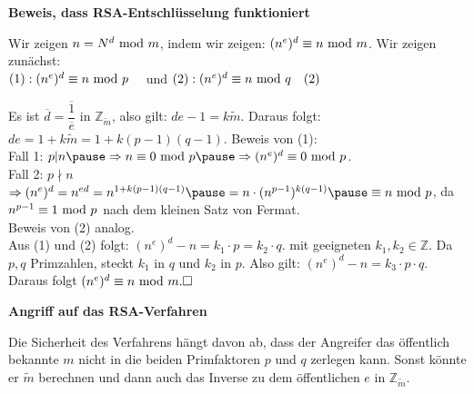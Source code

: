 \begin{frame}[fragile]

\textbf{Beweis, dass RSA-Entschlüsselung funktioniert} \pause

Wir zeigen $n = N^d \text{ mod } m$, indem wir zeigen: $(n^e)^d \equiv n \text{ mod } m$. \pause Wir zeigen
zunächst: \\
$(1): (n^e)^d \equiv n \text{ mod } p \quad  $ und $(2): (n^e)^d \equiv n \text{ mod } q \quad (2)$  \pause

Es ist $\overline{d} = \dfrac{\overline{1}}{\overline{e}}$ in $\mathbb{Z}_{\tilde{m}}$\pause, also gilt: $de - 1 = k \tilde{m}$. \pause Daraus folgt: $de = 1 + k\tilde{m} = 1+k(p-1)(q-1)$. \pause Beweis von (1):  \\ \pause
Fall 1: $p|n \pause \Rightarrow n \equiv 0 \tmod p \pause \Rightarrow (n^e)^d \equiv 0 \tmod p$. \\ \pause
Fall 2: $p \nmid n$ \pause $\Rightarrow (n^e) ^d = n^{ed} = n^{1+k(p-1)(q-1)}\pause = n \cdot (n^{p-1})^{k(q-1)} \pause \equiv n \tmod p$\pause, 
da $n^{p-1}\equiv 1 \text{ mod } p$ nach dem kleinen Satz von Fermat. \pause \\ Beweis von (2) analog. \\ \pause
Aus (1) und (2) folgt: $(n^e)^d - n = k_1 \cdot p = k_2 \cdot q$. mit geeigneten $k_1, k_2 \in \mathbb{Z}$. \pause Da $p, q$ Primzahlen, steckt $k_1$ in $q$ und $k_2$ in $p$. \pause
Also gilt:  $(n^e)^d - n = k_3 \cdot p \cdot q$. \pause Daraus folgt  $(n^e)^d \equiv n \tmod m. \hfill \square{}$

\end{frame}

\begin{frame}[fragile]

\textbf{Angriff auf das RSA-Verfahren} \pause

Die Sicherheit des Verfahrens hängt davon ab, dass der Angreifer das öffentlich bekannte $m$ nicht in die beiden
Primfaktoren $p$ und $q$ zerlegen kann. \pause Sonst könnte er $\tilde{m}$ berechnen und dann auch das Inverse zu dem öffentlichen $e$ in $\mathbb{Z}_{\tilde{m}}$. 
\end{frame}

